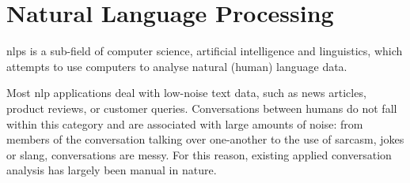 \section{Natural Language Processing \label{sec: nlp}}

\Glspl{nlp} is a sub-field of computer science, artificial intelligence and linguistics, which attempts to use computers to analyse natural (human) language data. 


Most \gls{nlp} applications deal with low-noise text data, such as news articles\cite{mediaBias}, product reviews\cite{productReviews}, or customer queries\cite{queryClassification}. Conversations between humans do not fall within this category and are associated with large amounts of noise: from members of the conversation talking over one-another to the use of sarcasm, jokes or slang, conversations are messy. For this reason, existing applied conversation analysis has largely been manual in nature\cite{daApplications, ap_psychological, ap_trump, ap_interview}.